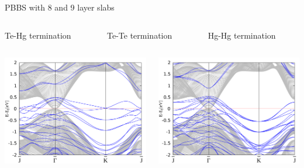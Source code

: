 \begin{frame}{PBBS with 8 and 9 layer slabs}
	\begin{columns}
		\begin{column}{.34\linewidth}
			\centering
			Te-Hg termination
		\end{column}
		\begin{column}{.34\linewidth}
			\centering
			Te-Te termination
		\end{column}
		\begin{column}{.34\linewidth}
			\centering
			Hg-Hg termination
		\end{column}
	\end{columns}
	\begin{columns}
		\begin{column}{.34\linewidth}
			\centering
			\includegraphics[width=\linewidth]{Te_and_Hg_termination/no_H_bulk+8_layers_no_dos_-2_2.pdf}
		\end{column}
		\begin{column}{.34\linewidth}
			\centering
			\includegraphics[width=\linewidth]{Te_termination/no_H_bulk+9_layers_no_dos_-2_2.pdf}

\end{column}
\end{columns}
\end{frame}

